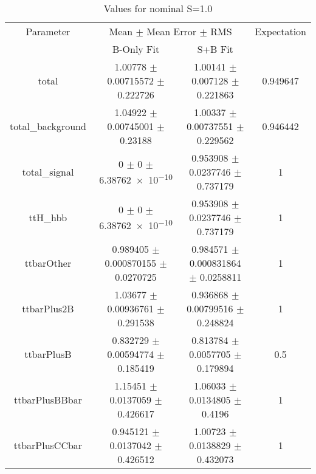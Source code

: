 \begin{table}
\centering
\caption{Values for nominal S=1.0}
\begin{tabular}{cccc}
\toprule
Parameter & \multicolumn{2}{c}{Mean $\pm$ Mean Error $\pm$ RMS} & Expectation\\
 & B-Only Fit & S+B Fit & \\
\midrule
total & \num{1.00778} $\pm$ \num{0.00715572} $\pm$ \num{0.222726} & \num{1.00141} $\pm$ \num{0.007128} $\pm$ \num{0.221863} & \num{0.949647}\\
total\_background & \num{1.04922} $\pm$ \num{0.00745001} $\pm$ \num{0.23188} & \num{1.00337} $\pm$ \num{0.00737551} $\pm$ \num{0.229562} & \num{0.946442}\\
total\_signal & \num{0} $\pm$ \num{0} $\pm$ \num{6.38762e-10} & \num{0.953908} $\pm$ \num{0.0237746} $\pm$ \num{0.737179} & \num{1}\\
ttH\_hbb & \num{0} $\pm$ \num{0} $\pm$ \num{6.38762e-10} & \num{0.953908} $\pm$ \num{0.0237746} $\pm$ \num{0.737179} & \num{1}\\
ttbarOther & \num{0.989405} $\pm$ \num{0.000870155} $\pm$ \num{0.0270725} & \num{0.984571} $\pm$ \num{0.000831864} $\pm$ \num{0.0258811} & \num{1}\\
ttbarPlus2B & \num{1.03677} $\pm$ \num{0.00936761} $\pm$ \num{0.291538} & \num{0.936868} $\pm$ \num{0.00799516} $\pm$ \num{0.248824} & \num{1}\\
ttbarPlusB & \num{0.832729} $\pm$ \num{0.00594774} $\pm$ \num{0.185419} & \num{0.813784} $\pm$ \num{0.0057705} $\pm$ \num{0.179894} & \num{0.5}\\
ttbarPlusBBbar & \num{1.15451} $\pm$ \num{0.0137059} $\pm$ \num{0.426617} & \num{1.06033} $\pm$ \num{0.0134805} $\pm$ \num{0.4196} & \num{1}\\
ttbarPlusCCbar & \num{0.945121} $\pm$ \num{0.0137042} $\pm$ \num{0.426512} & \num{1.00723} $\pm$ \num{0.0138829} $\pm$ \num{0.432073} & \num{1}\\
\bottomrule
\end{tabular}
\end{table}